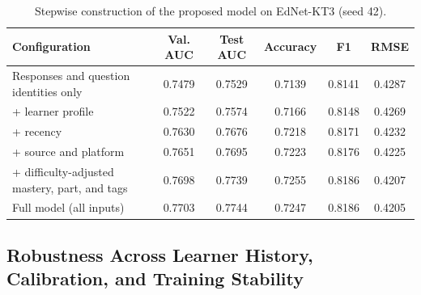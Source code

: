 \documentclass[11pt]{article}
\begin{document}
\begin{table}[t]
\centering
\caption{Stepwise construction of the proposed model on EdNet-KT3 (seed 42).}
\label{tab:steps}
\small\setlength{\tabcolsep}{4pt}
\begin{tabular}{@{}lccccc@{}}
\toprule
Configuration & Val. AUC & Test AUC & Accuracy & F1 & RMSE \\
\midrule
Responses and question identities only & 0.7479 & 0.7529 & 0.7139 & 0.8141 & 0.4287 \\
+ learner profile & 0.7522 & 0.7574 & 0.7166 & 0.8148 & 0.4269 \\
+ recency & 0.7630 & 0.7676 & 0.7218 & 0.8171 & 0.4232 \\
+ source and platform & 0.7651 & 0.7695 & 0.7223 & 0.8176 & 0.4225 \\
+ difficulty-adjusted mastery, part, and tags & 0.7698 & 0.7739 & 0.7255 & 0.8186 & 0.4207 \\
Full model (all inputs) & 0.7703 & 0.7744 & 0.7247 & 0.8186 & 0.4205 \\
\bottomrule
\end{tabular}
\end{table}

\subsection{Robustness Across Learner History, Calibration, and Training Stability}
\end{document}
